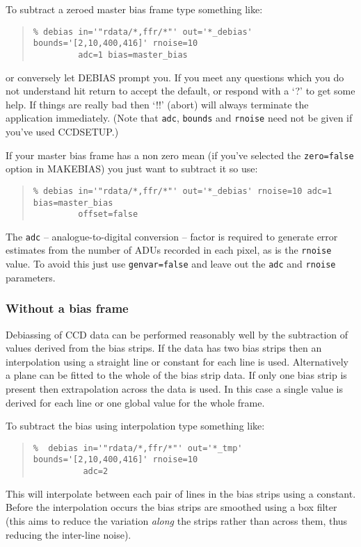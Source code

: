 \documentclass[twoside,11pt]{article}
\newcommand{\htmlref}[2]{#1}
\newcommand{\xlabel}[1]{}
\renewcommand{\_}{\texttt{\symbol{95}}}
\newenvironment{myquote}{\begin{quote}\begin{small}}{\end{small}\end{quote}}
\newcommand{\text}[1]{{\small \tt #1}}
\newcommand{\routine}[1]{{\sc #1}}
\newcommand{\xroutine}[1]{\htmlref{{\sc #1}}{#1}}
\begin{document}
To subtract a zeroed master bias frame type something like:
\begin{myquote}
\begin{verbatim}
% debias in='"rdata/*,ffr/*"' out='*_debias' bounds='[2,10,400,416]' rnoise=10
         adc=1 bias=master_bias
\end{verbatim}
\end{myquote}
or conversely let \routine{DEBIAS} prompt you. If you meet any questions which you
do not understand hit return to accept the default, or respond with a
`?' to get some help. If things are really bad then `!!' (abort) will
always terminate the application immediately. (Note that \text{adc},
\text{bounds} and \text{rnoise} need not be given if you've used
\xroutine{CCDSETUP}.)

If your master bias frame has a non zero mean (if you've selected
the \text{zero=false} option in \routine{MAKEBIAS}) you just want to subtract
it so use:
\begin{myquote}
\begin{verbatim}
% debias in='"rdata/*,ffr/*"' out='*_debias' rnoise=10 adc=1 bias=master_bias
         offset=false
\end{verbatim}
\end{myquote}
The \text{adc}  -- analogue-to-digital conversion --  factor is
required to generate error estimates from the number of ADUs recorded in
each pixel, as is the \text{rnoise} value.
To avoid this just use \text{genvar=false} and leave out the
\text{adc} and \text{rnoise} parameters.

\subsubsection{\xlabel{nobiasframes}Without a bias frame}

Debiassing of CCD data can be performed reasonably well by the
subtraction of values derived from the bias strips.
If the data has two bias strips then an interpolation using a straight
line or constant for each line is used.
Alternatively a plane can be fitted to the whole of the bias strip data.
If only one bias strip is present then extrapolation across the data
is used. In this case a single value is derived for each line or
one global value for the whole frame.

To subtract the bias using interpolation type something like:
\begin{myquote}
\begin{verbatim}
%  debias in='"rdata/*,ffr/*"' out='*_tmp' bounds='[2,10,400,416]' rnoise=10
          adc=2
\end{verbatim}
\end{myquote}
This will interpolate between each pair of lines in the bias strips
using a  constant. Before the interpolation occurs the bias strips are
smoothed using a box filter (this aims to reduce the variation {\em along}
the strips rather than across them, thus reducing the inter-line noise).
\end{document}
